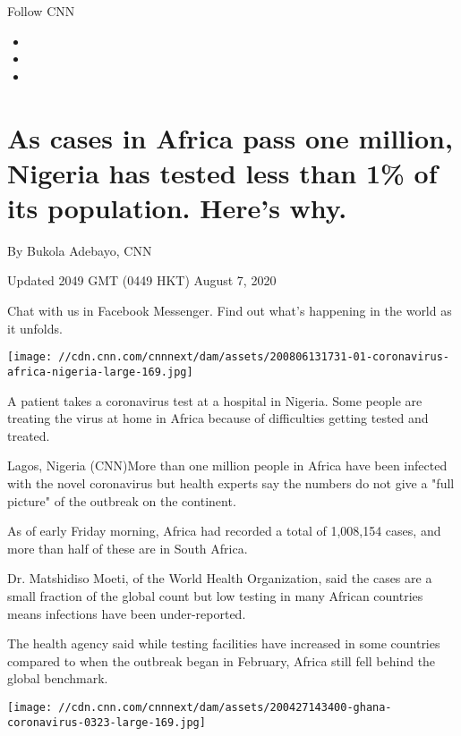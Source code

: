 Follow CNN

\begin{itemize}
\item
\item
\item
\end{itemize}

\hypertarget{as-cases-in-africa-pass-one-million-nigeria-has-tested-less-than-1-of-its-population-heres-why}{%
\section{As cases in Africa pass one million, Nigeria has tested less
than 1\% of its population. Here's
why.}\label{as-cases-in-africa-pass-one-million-nigeria-has-tested-less-than-1-of-its-population-heres-why}}

By Bukola Adebayo, CNN

Updated 2049 GMT (0449 HKT) August 7, 2020

Chat with us in Facebook Messenger. Find out what's happening in the
world as it unfolds.

\texttt{[image: //cdn.cnn.com/cnnnext/dam/assets/200806131731-01-coronavirus-africa-nigeria-large-169.jpg]}

A patient takes a coronavirus test at a hospital in Nigeria. Some people
are treating the virus at home in Africa because of difficulties getting
tested and treated.

Lagos, Nigeria (CNN)More than one million people in Africa have been
infected with the novel coronavirus but health experts say the numbers
do not give a "full picture" of the outbreak on the continent.

As of early Friday morning, Africa had recorded a total of 1,008,154
cases, and more than half of these are in South Africa.

Dr. Matshidiso Moeti, of the World Health Organization, said the cases
are a small fraction of the global count but low testing in many African
countries means infections have been under-reported.

The health agency said while testing facilities have increased in some
countries compared to when the outbreak began in February, Africa still
fell behind the global benchmark.

\href{/2020/06/16/africa/africa-coronavirus-cases-prevention-intl/index.html}{}

\texttt{[image: //cdn.cnn.com/cnnnext/dam/assets/200427143400-ghana-coronavirus-0323-large-169.jpg]}

